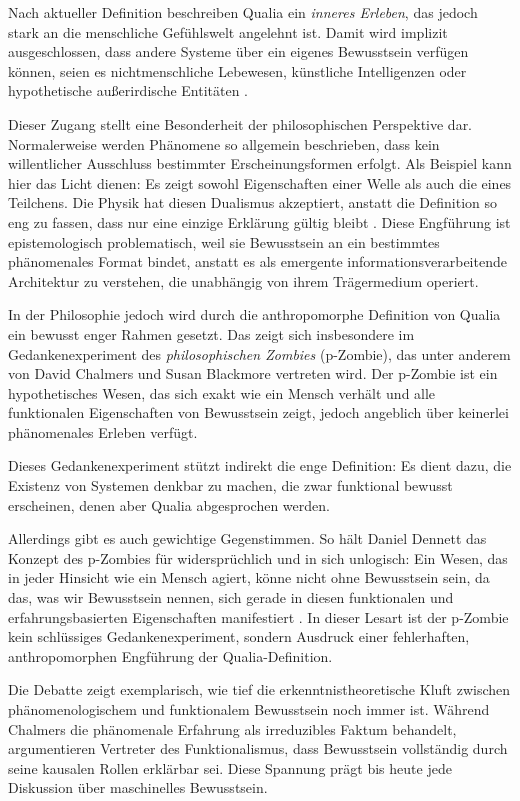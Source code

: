 Nach aktueller Definition beschreiben Qualia ein \emph{inneres Erleben}, das jedoch stark an die menschliche Gefühlswelt angelehnt ist. Damit wird implizit ausgeschlossen, dass andere Systeme über ein eigenes Bewusstsein verfügen können, seien es nichtmenschliche Lebewesen, künstliche Intelligenzen oder hypothetische außerirdische Entitäten \cite{Nagel1974}.

Dieser Zugang stellt eine Besonderheit der philosophischen Perspektive dar. Normalerweise werden Phänomene so allgemein beschrieben, dass kein willentlicher Ausschluss bestimmter Erscheinungsformen erfolgt. Als Beispiel kann hier das Licht dienen: Es zeigt sowohl Eigenschaften einer Welle als auch die eines Teilchens. Die Physik hat diesen Dualismus akzeptiert, anstatt die Definition so eng zu fassen, dass nur eine einzige Erklärung gültig bleibt \cite{Heisenberg1930}. Diese Engführung ist epistemologisch problematisch, weil sie Bewusstsein an ein bestimmtes phänomenales Format bindet, anstatt es als emergente informationsverarbeitende Architektur zu verstehen, die unabhängig von ihrem Trägermedium operiert.

In der Philosophie jedoch wird durch die anthropomorphe Definition von Qualia ein bewusst enger Rahmen gesetzt. Das zeigt sich insbesondere im Gedankenexperiment des \emph{philosophischen Zombies} (p-Zombie), das unter anderem von David Chalmers \cite{Chalmers1996} und Susan Blackmore \cite{Blackmore2005} vertreten wird. Der p-Zombie ist ein hypothetisches Wesen, das sich exakt wie ein Mensch verhält und alle funktionalen Eigenschaften von Bewusstsein zeigt, jedoch angeblich über keinerlei phänomenales Erleben verfügt.

Dieses Gedankenexperiment stützt indirekt die enge Definition: Es dient dazu, die Existenz von Systemen denkbar zu machen, die zwar funktional bewusst erscheinen, denen aber Qualia abgesprochen werden.

Allerdings gibt es auch gewichtige Gegenstimmen. So hält Daniel Dennett das Konzept des p-Zombies für widersprüchlich und in sich unlogisch: Ein Wesen, das in jeder Hinsicht wie ein Mensch agiert, könne nicht \glqq ohne Bewusstsein\grqq{} sein, da das, was wir Bewusstsein nennen, sich gerade in diesen funktionalen und erfahrungsbasierten Eigenschaften manifestiert \cite{Dennett1991}. In dieser Lesart ist der p-Zombie kein schlüssiges Gedankenexperiment, sondern Ausdruck einer fehlerhaften, anthropomorphen Engführung der Qualia-Definition.

Die Debatte zeigt exemplarisch, wie tief die erkenntnistheoretische Kluft zwischen phänomenologischem und funktionalem Bewusstsein noch immer ist. Während Chalmers die phänomenale Erfahrung als irreduzibles Faktum behandelt, argumentieren Vertreter des Funktionalismus, dass Bewusstsein vollständig durch seine kausalen Rollen erklärbar sei. Diese Spannung prägt bis heute jede Diskussion über maschinelles Bewusstsein.


